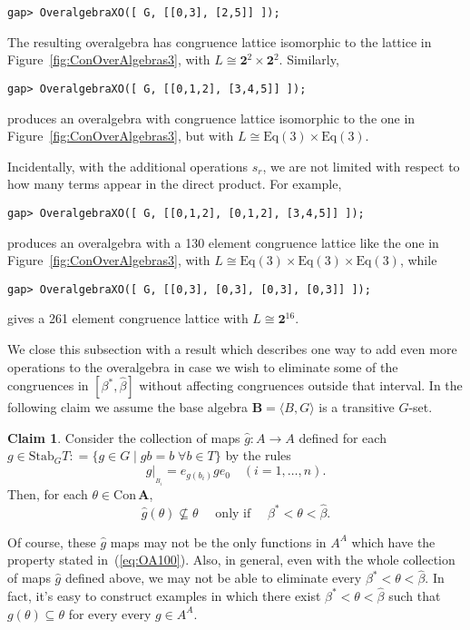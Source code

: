 \documentclass[cm,dissertation]{uhthesis}
\theoremstyle{plain}
\theoremstyle{definition}
\newcounter{claim}
\newtheorem{claim}[claim]{Claim}
\theoremstyle{remark}
\numberwithin{theorem}{section}
\numberwithin{claim}{chapter}
\numberwithin{equation}{section}
\numberwithin{conjecture}{chapter}
\newcommand{\<}{\ensuremath{\langle}}
\renewcommand{\>}{\ensuremath{\rangle}}
\newcommand{\Eq}{\ensuremath{\mathrm{Eq}}}
\newcommand{\Stab}{\ensuremath{\mathrm{Stab}}}
\newcommand{\Con}{\ensuremath{\mathrm{Con\,}}}
\newcommand{\0}{\ensuremath{\mathbf{0}}}
\newcommand{\1}{\ensuremath{\mathbf{1}}}
\newcommand{\2}{\ensuremath{\mathbf{2}}}
\newcommand{\3}{\ensuremath{\mathbf{3}}}
\newcommand{\4}{\ensuremath{\mathbf{4}}}
\newcommand{\5}{\ensuremath{\mathbf{5}}}
\newcommand{\bA}{\ensuremath{\mathbf{A}}}
\newcommand{\bB}{\ensuremath{\mathbf{B}}}
\newcommand{\resBi}{\ensuremath{|_{_{B_i}}}}
\newcommand{\two}{\ensuremath{\mathbf{2}}}
\begin{document}
{\footnotesize
\begin{verbatim}
gap> OveralgebraXO([ G, [[0,3], [2,5]] ]);
\end{verbatim}
}

\noindent The resulting overalgebra has congruence lattice isomorphic to the lattice in
Figure~\ref{fig:ConOverAlgebras3}, with
$L \cong \two^2\times\two^2$.  
Similarly, 

{\footnotesize
\begin{verbatim}
gap> OveralgebraXO([ G, [[0,1,2], [3,4,5]] ]);
\end{verbatim}
}

\noindent produces an overalgebra with congruence lattice isomorphic to the one in
Figure~\ref{fig:ConOverAlgebras3}, but with
$L \cong \Eq(3) \times\Eq(3)$.

Incidentally, with the additional operations $s_r$, we
are not limited with respect to how many terms appear in the direct
product.  For example, 

{\footnotesize
\begin{verbatim}
gap> OveralgebraXO([ G, [[0,1,2], [0,1,2], [3,4,5]] ]);
\end{verbatim}
}

\noindent produces an overalgebra with a 130 element congruence lattice 
like the one in Figure~\ref{fig:ConOverAlgebras3}, with 
$L \cong \Eq(3)\times \Eq(3)\times \Eq(3)$, while

{\footnotesize
\begin{verbatim}
gap> OveralgebraXO([ G, [[0,3], [0,3], [0,3], [0,3]] ]);
\end{verbatim}
}

\noindent gives a 261 element congruence lattice 
with $L \cong \two^{16}$. %

We close this subsection with a result which describes one way to add even more
operations to the overalgebra in case we wish to eliminate some of the
congruences in $[\beta^*, \widehat{\beta}]$ without affecting congruences outside that
interval.  In the following claim we assume the base algebra $\bB = \<B, G\>$ is a
transitive $G$-set.
\begin{claim}
Consider the collection of maps $\widehat{g}:A\rightarrow A$ defined 
for each $g\in \Stab_GT: = \{g\in G \mid gb = b \; \forall b \in T\}$ by the rules
\[
\widehat{g}\resBi = e_{g(b_i)} g e_0 \quad (i=1, \dots, n).
\]
Then, for each $\theta \in \Con \bA$,
\begin{equation}
  \label{eq:OA100}
  \widehat{g}(\theta) \nsubseteq \theta \quad \text{ only if } \quad
  \beta^* <\theta <\widehat{\beta}.
\end{equation}
\end{claim}
Of course, these $\widehat{g}$ maps may not be the only
functions in $A^A$ which have the property stated in~(\ref{eq:OA100}).
Also, in general, even with the whole collection of maps $\widehat{g}$ defined
above, we may not be able to eliminate every  $\beta^* <\theta
<\widehat{\beta}$.  
In fact, it's easy to construct examples in which there exist
$\beta^* <\theta <\widehat{\beta}$ such that 
$g(\theta) \subseteq \theta$ for every every $g \in A^A$.
\end{document}
